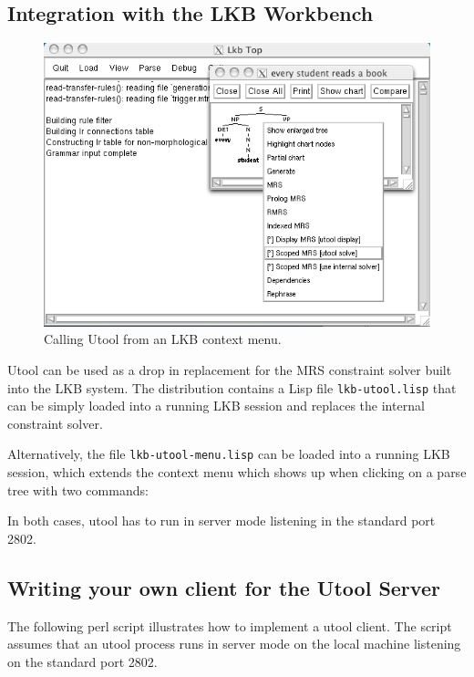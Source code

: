 \subsection{Integration with the LKB Workbench}
\label{sec:integration-lkb}

\begin{figure}
\includegraphics[width=\textwidth]{lkb-integration}
\caption{Calling Utool from an LKB context menu.
\label{fig:lkb-integration}}
\end{figure}

Utool can be used as a drop in replacement for the MRS constraint
solver built into the LKB system. The distribution contains a Lisp
file \verb|lkb-utool.lisp| that can be simply loaded into a running
LKB session and replaces the internal constraint solver.

Alternatively, the file \verb|lkb-utool-menu.lisp| can be loaded into
a running LKB session, which extends the context menu which shows up
when clicking on a parse tree with two commands:

In both cases, utool has to run in server mode listening in the
standard port 2802.

\subsection{Writing your own client for the Utool Server}

The following perl script illustrates how to implement a utool client.
The script assumes that an utool process runs in server mode on the
local machine listening on the standard port 2802.

